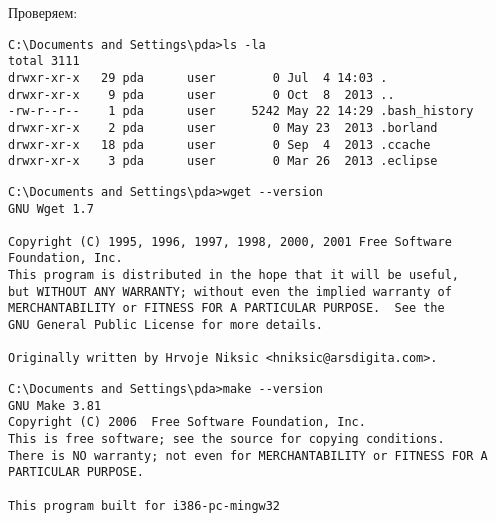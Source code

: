 \bigskip Проверяем:
\begin{lstlisting}[style=con]
C:\Documents and Settings\pda>ls -la
total 3111
drwxr-xr-x   29 pda      user        0 Jul  4 14:03 .
drwxr-xr-x    9 pda      user        0 Oct  8  2013 ..
-rw-r--r--    1 pda      user     5242 May 22 14:29 .bash_history
drwxr-xr-x    2 pda      user        0 May 23  2013 .borland
drwxr-xr-x   18 pda      user        0 Sep  4  2013 .ccache
drwxr-xr-x    3 pda      user        0 Mar 26  2013 .eclipse
\end{lstlisting}
\begin{lstlisting}[style=con]
C:\Documents and Settings\pda>wget --version
GNU Wget 1.7

Copyright (C) 1995, 1996, 1997, 1998, 2000, 2001 Free Software Foundation, Inc.
This program is distributed in the hope that it will be useful,
but WITHOUT ANY WARRANTY; without even the implied warranty of
MERCHANTABILITY or FITNESS FOR A PARTICULAR PURPOSE.  See the
GNU General Public License for more details.

Originally written by Hrvoje Niksic <hniksic@arsdigita.com>.
\end{lstlisting}
\begin{lstlisting}[style=con]
C:\Documents and Settings\pda>make --version
GNU Make 3.81
Copyright (C) 2006  Free Software Foundation, Inc.
This is free software; see the source for copying conditions.
There is NO warranty; not even for MERCHANTABILITY or FITNESS FOR A
PARTICULAR PURPOSE.

This program built for i386-pc-mingw32
\end{lstlisting}


